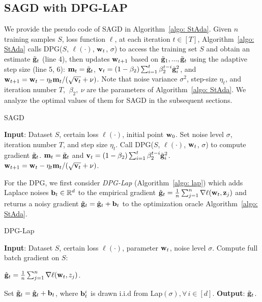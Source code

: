 \documentclass[11pt]{article}
\begin{document}
\subsection{\textsc{SAGD} with DPG-LAP} \label{subsec: SAGD_lap}

We provide the pseudo code of \textsc{SAGD} in Algorithm~\ref{algo: StAda}. 
Given $n$ training samples $S$, loss function $\ell$, at each iteration $t \in [T]$, Algorithm~\ref{algo: StAda} calls DPG($S$,  $\ell(\cdot)$, $\mathbf{w}_t$, $\sigma$) to access the training set $S$ and obtain an estimate $\tilde {\mathbf{g}}_t$ (line 4), then updates $\mathbf{w}_{t+1}$ based on $\tilde {\mathbf{g}}_1,..., \tilde {\mathbf{g}}_t$ using the adaptive step size (line 5, 6):
$\mathbf{m}_t = \tilde {\mathbf{g}}_t$, $\mathbf{v}_t = \left(1-\beta_{2}\right) \sum_{i=1}^{t} \beta_{2}^{t-i} \tilde {\mathbf{g}}_{i}^{2}$, and $\mathbf{w}_{t+1}=\mathbf{w}_{t}-\eta_t \mathbf{m}_t /(\sqrt{\mathbf{v}_t}+\nu)$.
Note that noise variance $\sigma^2$, step-size $\eta_t$, and iteration number $T$, $~ \beta_2,~\nu$ are the parameters of Algorithm~\ref{algo: StAda}. 
We analyze the optimal values of them for \textsc{SAGD} in the subsequent sections. 

\begin{algorithm}[H] 
\caption{\textsc{SAGD}}
\begin{algorithmic}[1] \label{algo: StAda}
\STATE \textbf{Input}: Dataset $S$,  certain loss $\ell(\cdot)$, initial point $\mathbf{w}_0$.
\STATE Set  noise level $\sigma$, iteration number $T$,  and step size $\eta_t$.
\STATE  Call DPG($S$,  $\ell(\cdot)$, $\mathbf{w}_t$, $\sigma$) to compute gradient $\tilde {\mathbf{g}}_t$.
\STATE 
$\mathbf{m}_t = \tilde {\mathbf{g}}_t$ and $\mathbf{v}_t = \left(1-\beta_{2}\right) \sum_{i=1}^{t} \beta_{2}^{t-i} \tilde {\mathbf{g}}_{i}^{2}$.
\STATE $\mathbf{w}_{t+1}=\mathbf{w}_{t}-\eta_t \mathbf{m}_t /(\sqrt{\mathbf{v}_t}+\nu)$.
\ENDFOR 
\end{algorithmic}
\end{algorithm}

For the DPG, we first consider \emph{DPG-Lap} (Algorithm~\ref{algo: lap}) which adds Laplace noises $\mathbf{b}_t \in \mathbb{R}^d$ to the empirical gradient $\hat {\mathbf{g}}_t = \frac{1}{n} \sum_{j=1}^n\nabla \ell(\mathbf{w}_t, \mathbf{z}_j)$ and returns a noisy gradient $\tilde {\mathbf{g}}_t = \hat {\mathbf{g}}_t + \mathbf{b}_t$ to the optimization oracle Algorithm~\ref{algo: StAda}. 

\begin{algorithm}[H]
\caption{DPG-Lap}
\begin{algorithmic}[1]
\label{algo: lap}
	\STATE \textbf{Input}: Dataset $S$,  certain loss $\ell(\cdot)$, parameter $\mathbf{w}_t$, noise level $\sigma$.
	\STATE Compute full batch gradient on $S$: \\
	\centerline{ $\hat {\mathbf{g}}_t = \frac{1}{n} \sum_{j=1}^n\nabla \ell(\mathbf{w}_t, z_j)$.}	
	\STATE Set $\tilde {\mathbf{g}}_t = \hat {\mathbf{g}}_t + \mathbf{b}_t$, where $\mathbf{b}_t^i$ is drawn i.i.d from Lap$(\sigma), \forall\, i \in [d]$.
	\STATE \textbf{Output}: $\tilde {\mathbf{g}}_t$.
	\end{algorithmic}
\end{algorithm}
\end{document}

